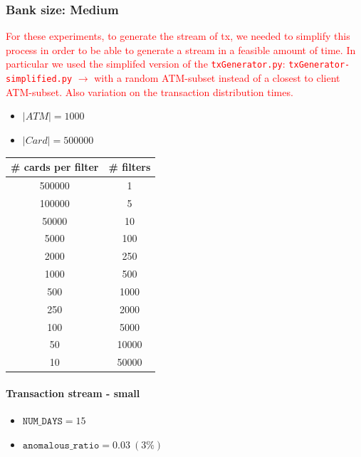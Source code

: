 \subsubsection{Bank size: Medium}

\textcolor{red}{For these experiments, to generate the stream of tx, we needed to simplify this process in order to be able to generate a stream in a feasible amount of time. In particular we used the simplifed version of the \texttt{txGenerator.py}: \texttt{txGenerator-simplified.py} $\rightarrow$ with a random ATM-subset instead of a closest to client ATM-subset. Also variation on the transaction distribution times.}


\begin{itemize}
  \item $|ATM| = 1000$
  \item $|Card| = 500000$
\end{itemize}

\begin{table}[H]
  \renewcommand{\arraystretch}{1.5} %
  \centering
  \begin{tabular}{|c|c|}
  \hline
  \# cards per filter & \# filters \\ \hline
  500000   &   1     \\ \hline
  100000   &   5     \\ \hline
  50000 &   10     \\ \hline
  5000  &   100     \\ \hline
  2000 &   250    \\ \hline
  1000  &   500    \\ \hline
  500  &   1000    \\ \hline
  250  &   2000    \\ \hline
  100  &   5000    \\ \hline
  50  &   10000    \\ \hline
  10  &   50000    \\ \hline
  \end{tabular}
\end{table}

\paragraph{Transaction stream - small\\}


\begin{itemize}
  \item $\texttt{NUM\_DAYS} = 15$
  \item $\texttt{anomalous\_ratio} = 0.03\ (3\%)$ 
\end{itemize}

